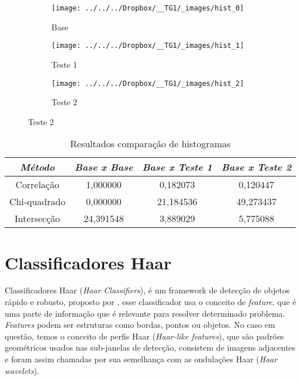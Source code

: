 \documentclass[ecp,tc]{iiufrgs}
\begin{document}
\begin{figure}[h]
	\centering
	\caption{Figuras de exemplo para comparação de histogramas}
	\begin{subfigure}[b]{0.3\textwidth}
		\texttt{[image: ../../../Dropbox/\_\_TG1/\_images/hist\_0]}
		\caption{Base}
		\label{fig:hist_0}
	\end{subfigure}
	\quad
	\begin{subfigure}[b]{0.3\textwidth}
		\texttt{[image: ../../../Dropbox/\_\_TG1/\_images/hist\_1]}
		\caption{Teste 1}
		\label{fig:hist_1}
	\end{subfigure}
	\quad
	\begin{subfigure}[b]{0.3\textwidth}
		\texttt{[image: ../../../Dropbox/\_\_TG1/\_images/hist\_2]}
		\caption{Teste 2}
		\label{fig:hist_2}
	\end{subfigure}
	\label{fig:hist}
\end{figure}

\begin{table}[h]
	\caption{Resultados comparação de histogramas}
	\begin{center}
		\begin{tabular}{c|c|c|c}
			\textit{Método}  &   \textit{Base x Base}  &   \textit{Base x Teste 1} & \textit{Base x Teste 2}  \\
			\hline
			\hline
			Correlação & 1,000000 &	0,182073 & 0,120447 \\
			\hline
			Chi-quadrado & 0,000000 & 21,184536 & 49,273437 \\
			\hline
			Intersecção & 24,391548 & 3,889029 & 5,775088 \\
			\hline
		\end{tabular}
	\end{center}
	\label{tbl:hist}
\end{table}


\section{Classificadores Haar}
Classificadores Haar (\textit{Haar Classifiers}), é um framework de detecção de objetos rápido e robusto, proposto por , esse classificador usa o conceito de \textit{feature}, que é uma parte de informação que é relevante para resolver determinado problema. \textit{Features} podem ser estruturas como bordas, pontos ou objetos. No caso em questão, temos o conceito de perfis Haar (\textit{Haar-like features}), que são padrões geométricos usados nas sub-janelas de detecção, consistem de imagens adjacentes e foram assim chamadas por sua semelhança com as ondulações Haar (\textit{Haar wavelets}).
\end{document}
